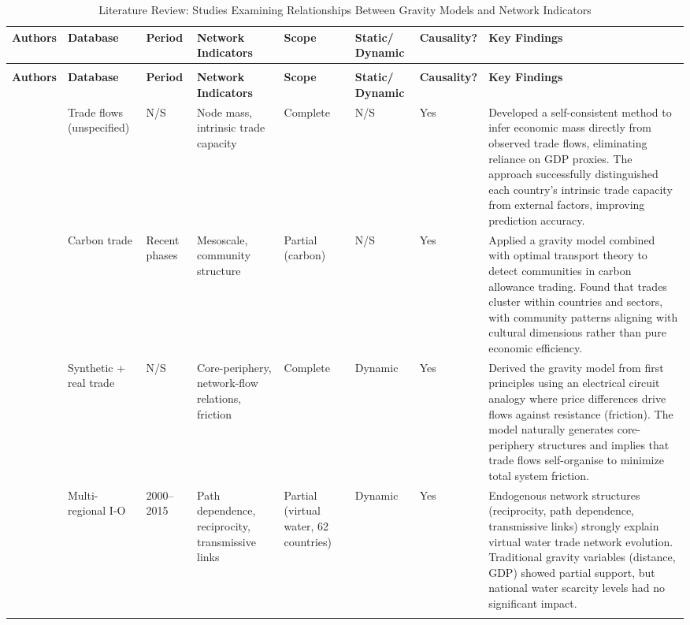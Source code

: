 \documentclass[preprint, 3p,
authoryear]{elsarticle} %
\begin{document}
\begin{landscape}
\begin{longtable}{p{2.2cm}p{2cm}p{1.5cm}p{3.0cm}p{1.8cm}p{1.2cm}p{1.2cm}p{8cm}}
\caption{Literature review: studies examining relationships between gravity models and network indicators}\label{tab:literature_review}\\
\toprule
\textbf{Authors} & \textbf{Database} & \textbf{Period} & \textbf{Network Indicators} & \textbf{Scope} & \textbf{Static/ Dynamic} & \textbf{Causality?} & \textbf{Key Findings} \\
\midrule
\endfirsthead
\caption{Literature Review: Studies Examining Relationships Between Gravity Models and Network Indicators}\\
\toprule
\textbf{Authors} & \textbf{Database} & \textbf{Period} & \textbf{Network Indicators} & \textbf{Scope} & \textbf{Static/ Dynamic} & \textbf{Causality?} & \textbf{Key Findings} \\
\midrule
\endhead
\cite{lee2025selfconsistent} & Trade flows (unspecified) & N/S & Node mass, intrinsic trade capacity & Complete & N/S & Yes & Developed a self-consistent method to infer economic mass directly from observed trade flows, eliminating reliance on GDP proxies. The approach successfully distinguished each country's intrinsic trade capacity from external factors, improving prediction accuracy. \\
\addlinespace

\cite{flori2025carbon} & Carbon trade & Recent phases & Mesoscale, community structure & Partial (carbon) & N/S & Yes & Applied a gravity model combined with optimal transport theory to detect communities in carbon allowance trading. Found that trades cluster within countries and sectors, with community patterns aligning with cultural dimensions rather than pure economic efficiency.  \\
\addlinespace

\cite{robinson2025electrical} & Synthetic + real trade & N/S & Core-periphery, network-flow relations, friction & Complete & Dynamic & Yes & Derived the gravity model from first principles using an electrical circuit analogy where price differences drive flows against resistance (friction). The model naturally generates core-periphery structures and implies that trade flows self-organise to minimize total system friction.  \\
\addlinespace

\cite{xing2023structural} & Multi-regional I-O & 2000–2015 & Path dependence, reciprocity, transmissive links & Partial (virtual water, 62 countries) & Dynamic & Yes & Endogenous network structures (reciprocity, path dependence, transmissive links) strongly explain virtual water trade network evolution. Traditional gravity variables (distance, GDP) showed partial support, but national water scarcity levels had no significant impact. \\
\addlinespace


\end{longtable}
\end{landscape}
\end{document}
